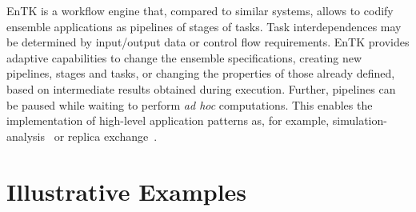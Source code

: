 \documentclass[preprint,12pt, a4paper]{elsarticle}
\begin{document}

EnTK is a workflow engine that, compared to similar systems, allows to codify
ensemble applications as pipelines of stages of tasks. Task interdependences
may be determined by input/output data or control flow requirements.
%
%
EnTK provides adaptive capabilities to change the ensemble specifications,
creating new pipelines, stages and tasks, or changing the properties of those
already defined, based on intermediate results obtained during execution.
Further, pipelines can be paused while waiting to perform \textit{ad hoc}
computations. This enables the implementation of high-level application
patterns as, for example,
simulation-analysis~\cite{balasubramanian2016extasy} or replica
exchange~\cite{treikalis2016repex}.






\section{Illustrative Examples}\label{sec:examples}

\end{document}
